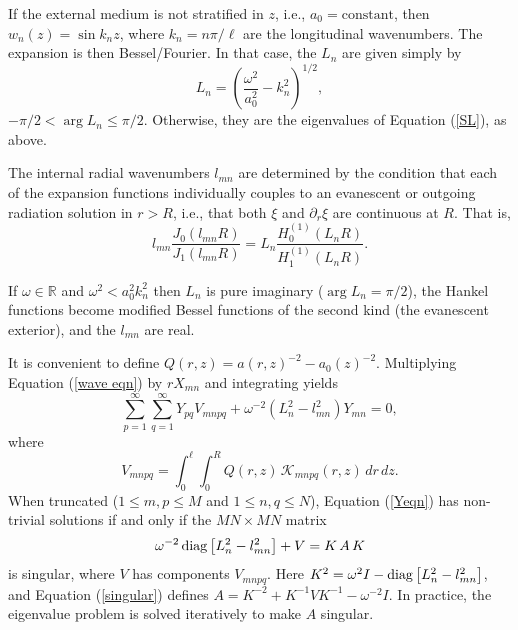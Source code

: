 \documentclass[12pt]{iopart}
\renewcommand{\L}{{\ell}}
\newcommand{\diag}{\mathop{\rm diag}}
\begin{document}
If the external medium is not stratified in $z$, i.e., $a_0=\text{constant}$, then $w_n(z)=\sin k_n z$, where $k_n=n\pi/\L$ are the longitudinal wavenumbers. The expansion is then Bessel/Fourier. In that case, the $L_n$ are given simply by
\begin{equation}
L_n = \left(\frac{\omega^2}{a_0^2}-k_n^2\right)^{1/2},   \label{L}
\end{equation}
$-\pi/2<\arg L_n\le\pi/2$. Otherwise, they are the eigenvalues of Equation (\ref{SL}), as above.


The internal radial wavenumbers $l_{mn}$ are determined by the condition that each of the expansion functions individually couples to an evanescent or outgoing radiation solution in $r>R$, i.e., that both $\xi$ and $\partial_r\xi$ are continuous at $R$. That is,
\begin{equation}
l_{mn}\frac{J_0\left(l_{mn}R\right)}{J_1\left(l_{mn}R\right)} = L_{n}\frac{H^{(1)}_0\left(L_{n}R\right)}{H^{(1)}_1\left(L_{n}R\right)} .\label{JHmatch}
\end{equation}

If $\omega\in\mathds{R} $ and $\omega^2<a_0^2k_n^2$ then $L_n$ is pure imaginary ($\arg L_n=\pi/2$), the Hankel functions become modified Bessel functions of the second kind (the evanescent exterior), and the $l_{mn}$ are real.


It is convenient to define $Q(r,z)=a(r,z)^{-2}-a_0(z)^{-2}$. Multiplying Equation (\ref{wave eqn}) by $r X_{mn}$ and integrating yields
\begin{equation}
\sum_{p=1}^\infty\sum_{q=1}^\infty Y_{pq}V_{mnpq} +\omega^{-2}\left(L_n^2-l_{mn}^2\right)Y_{mn} =0, \label{Yeqn}
\end{equation}
where
\begin{equation}
V_{mnpq} = \int_0^\L\!\!\! \int_0^R  Q(r,z)\,\mathcal{K}_{mnpq}(r,z)\,dr\,dz.  \label{V}
\end{equation}
When truncated ($1\le m,p\le M$ and $1\le n,q\le N$), Equation (\ref{Yeqn}) has non-trivial solutions if and only if the $MN\times MN$ matrix 
\begin{equation}
 \omega^{-2}\diag\left[L_n^2-l_{mn}^2\right]+V =K\,A\,K \label{singular}
\end{equation}
is singular, where $V$ has components $V_{mnpq}$. Here $K^2=\omega^2 I-\diag\left[L_n^2-l_{mn}^2\right]$, and Equation (\ref{singular}) defines $A=K^{-2}+K^{-1}V K^{-1}-\omega^{-2} I$. In practice, the eigenvalue problem is solved iteratively to make $A$ singular.

\end{document}
